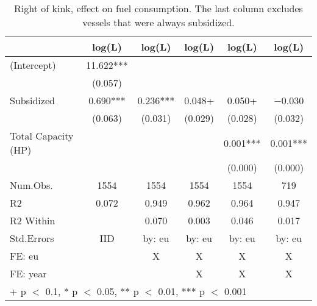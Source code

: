 \begin{table}

\caption{\label{tab:}Right of kink, effect on fuel consumption. The last column excludes vessels that were always subsidized.}
\centering
\begin{tabular}[t]{lccccc}
\toprule
  & log(L) & log(L)  & log(L)   & log(L)    & log(L)    \\
\midrule
(Intercept) & \num{11.622}*** &  &  &  & \\
 & (\num{0.057}) &  &  &  & \\
Subsidized & \num{0.690}*** & \num{0.236}*** & \num{0.048}+ & \num{0.050}+ & \num{-0.030}\\
 & (\num{0.063}) & (\num{0.031}) & (\num{0.029}) & (\num{0.028}) & (\num{0.032})\\
Total Capacity (HP) &  &  &  & \num{0.001}*** & \num{0.001}***\\
 &  &  &  & (\num{0.000}) & (\num{0.000})\\
\midrule
Num.Obs. & \num{1554} & \num{1554} & \num{1554} & \num{1554} & \num{719}\\
R2 & \num{0.072} & \num{0.949} & \num{0.962} & \num{0.964} & \num{0.947}\\
R2 Within &  & \num{0.070} & \num{0.003} & \num{0.046} & \num{0.017}\\
Std.Errors & IID & by: eu & by: eu & by: eu & by: eu\\
FE: eu &  & X & X & X & X\\
FE: year &  &  & X & X & X\\
\bottomrule
\multicolumn{6}{l}{\rule{0pt}{1em}+ p $<$ 0.1, * p $<$ 0.05, ** p $<$ 0.01, *** p $<$ 0.001}\\
\end{tabular}
\end{table}
